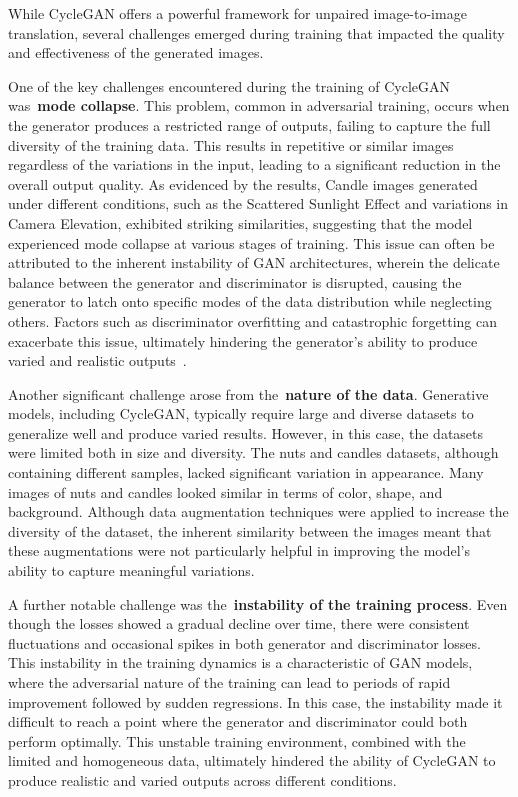 \documentclass[12pt,DIV14,BCOR12mm,a4paper,footinclude=false,headinclude,parskip=half-,twoside,openright,cleardoublepage=empty,toc=index,bibliography=totoc,listof=totoc]{scrreprt}
\numberwithin{equation}{chapter}
\begin{document}
While CycleGAN offers a powerful framework for unpaired image-to-image translation, several challenges emerged during training that impacted the quality and effectiveness of the generated images.

One of the key challenges encountered during the training of CycleGAN was~\textbf{mode collapse}. This problem, common in adversarial training, occurs when the generator produces a restricted range of outputs, failing to capture the full diversity of the training data. This results in repetitive or similar images regardless of the variations in the input, leading to a significant reduction in the overall output quality. As evidenced by the results, Candle images generated under different conditions, such as the Scattered Sunlight Effect and variations in Camera Elevation, exhibited striking similarities, suggesting that the model experienced mode collapse at various stages of training. This issue can often be attributed to the inherent instability of GAN architectures, wherein the delicate balance between the generator and discriminator is disrupted, causing the generator to latch onto specific modes of the data distribution while neglecting others. Factors such as discriminator overfitting and catastrophic forgetting can exacerbate this issue, ultimately hindering the generator's ability to produce varied and realistic outputs~\cite{modecollapse}.

Another significant challenge arose from the~\textbf{nature of the data}. Generative models, including CycleGAN, typically require large and diverse datasets to generalize well and produce varied results. However, in this case, the datasets were limited both in size and diversity. The nuts and candles datasets, although containing different samples, lacked significant variation in appearance. Many images of nuts and candles looked similar in terms of color, shape, and background. Although data augmentation techniques were applied to increase the diversity of the dataset, the inherent similarity between the images meant that these augmentations were not particularly helpful in improving the model’s ability to capture meaningful variations.

A further notable challenge was the~\textbf{instability of the training process}. Even though the losses showed a gradual decline over time, there were consistent fluctuations and occasional spikes in both generator and discriminator losses. This instability in the training dynamics is a characteristic of GAN models, where the adversarial nature of the training can lead to periods of rapid improvement followed by sudden regressions. In this case, the instability made it difficult to reach a point where the generator and discriminator could both perform optimally. This unstable training environment, combined with the limited and homogeneous data, ultimately hindered the ability of CycleGAN to produce realistic and varied outputs across different conditions.
\end{document}
